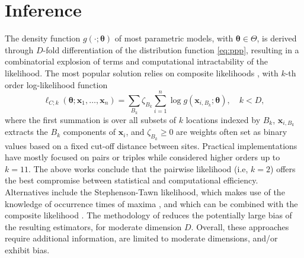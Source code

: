 \documentclass[12pt]{article}
\begin{document}
\section{Inference}
\label{sec:inference}


The density function $g(\cdot;\bm \theta)$ of most parametric models, with 
$\bm \theta \in \Theta$, is derived through $D$-fold differentiation of the distribution function \eqref{eq:ppp}, 
resulting
in a combinatorial explosion of terms and computational intractability of the likelihood. The most popular solution relies on composite likelihoods \citep{Padoan.etal:2010, Sang.Genton:2014}, with $k$-th order log-likelihood function 
%
\begin{equation}
\label{eq:composite}
\ell_{C;k}(\bm \theta;\bm x_1,\dots,\bm x_n)
=\sum_{B_k} \zeta_{B_k} \sum_{i=1}^n\log g(\bm x_{i,B_k};\bm \theta), \quad k< D,
\end{equation}
%
where the first summation is over all subsets of $k$ locations indexed by $B_k$, $\bm x_{i,B_k}$ extracts the $B_k$ components of $\bm x_i$, and $\zeta_{B_k} \geq 0$ are weights often set as binary values based on a fixed cut-off distance between sites. 
Practical implementations have mostly focused on pairs or triples \citep{Padoan.etal:2010, Huser.Davison:2013a} while \citet{Castruccio.etal:2016} considered higher orders up to $k=11$. The above works conclude that the pairwise likelihood (i.e, $k=2$) offers the best compromise between statistical and computational efficiency.
Alternatives include the Stephenson-Tawn likelihood, which makes use of the knowledge of occurrence times of maxima 
\citep{Stephenson.Tawn:2005, Wadsworth.Tawn:2014}, and which can be combined with the composite likelihood \citep{Beranger.etal:2021}. The methodology of \citet{Wadsworth:2015} reduces the potentially large bias of the resulting estimators, for moderate dimension $D$. Overall, these approaches require additional information, are limited to moderate dimensions, and/or exhibit bias.
\end{document}
